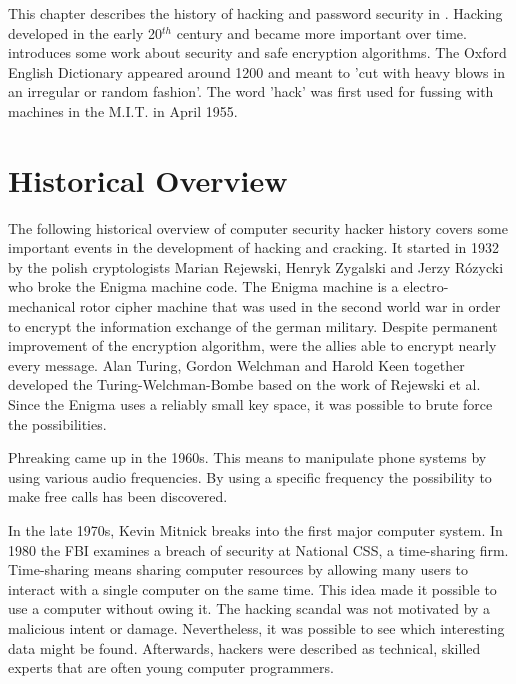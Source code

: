 This chapter describes the history of hacking and password security in . Hacking developed in the early 20$^{th}$ century and became more important over time.  introduces some work about security and safe encryption algorithms. 
The Oxford English Dictionary appeared around 1200 and meant to 'cut with heavy blows in an irregular or random fashion'. The word 'hack' was first used for fussing with machines in the M.I.T. in April 1955. 




\section{Historical Overview}
\label{sec:historicOverview}

The following historical overview of computer security hacker history covers some important events in the development of hacking and cracking. It started in 1932 by the polish cryptologists Marian Rejewski, Henryk Zygalski and Jerzy Rózycki who broke the Enigma machine code. The Enigma machine is a electro-mechanical rotor cipher machine that was used in the second world war in order to encrypt the information exchange of the german military. Despite permanent improvement of the encryption algorithm, were the allies able to encrypt nearly every message. 
Alan Turing, Gordon Welchman and Harold Keen together developed the Turing-Welchman-Bombe based on the work of Rejewski et al. Since the Enigma uses a reliably small key space, it was possible to brute force the possibilities. 

Phreaking came up in the 1960s. This means to manipulate phone systems by using various audio frequencies. By using a specific frequency the possibility to make free calls has been discovered.

In the late 1970s, Kevin Mitnick breaks into the first major computer system. In 1980 the FBI examines a breach of security at National CSS, a time-sharing firm. Time-sharing means sharing computer resources by allowing many users to interact with a single computer on the same time. This idea made it possible to use a computer without owing it. The hacking scandal was not motivated by a malicious intent or damage. Nevertheless, it was possible to see which interesting data might be found. Afterwards, hackers were described as technical, skilled experts that are often young computer programmers. 

